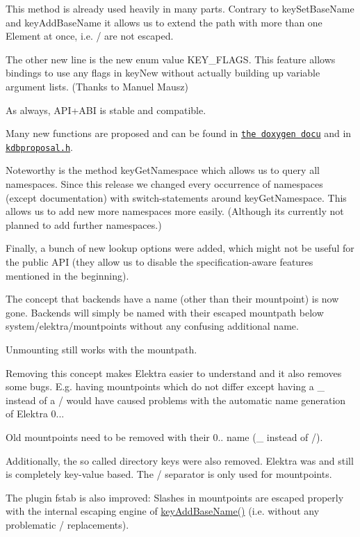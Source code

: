 This method is already used heavily in many parts. Contrary to {\ttfamily key\+Set\+Base\+Name} and {\ttfamily key\+Add\+Base\+Name} it allows us to extend the path with more than one Element at once, i.\+e. {\ttfamily /} are not escaped.

The other new line is the new enum value {\ttfamily K\+E\+Y\+\_\+\+F\+L\+A\+GS}. This feature allows bindings to use any flags in key\+New without actually building up variable argument lists. (Thanks to Manuel Mausz)

As always, A\+P\+I+\+A\+BI is stable and compatible.

Many new functions are proposed and can be found in \href{https://doc.libelektra.org/api/0.8.11/html}{\tt the doxygen docu} and in \href{https://github.com/ElektraInitiative/libelektra/blob/master/src/include/kdbproposal.h}{\tt kdbproposal.\+h}.

Noteworthy is the method {\ttfamily key\+Get\+Namespace} which allows us to query all namespaces. Since this release we changed every occurrence of namespaces (except documentation) with switch-\/statements around {\ttfamily key\+Get\+Namespace}. This allows us to add new more namespaces more easily. (Although its currently not planned to add further namespaces.)

Finally, a bunch of new lookup options were added, which might not be useful for the public A\+PI (they allow us to disable the specification-\/aware features mentioned in the beginning).

The concept that backends have a name (other than their mountpoint) is now gone. Backends will simply be named with their escaped mountpath below system/elektra/mountpoints without any confusing additional name.

Unmounting still works with the mountpath.

Removing this concept makes Elektra easier to understand and it also removes some bugs. E.\+g. having mountpoints which do not differ except having a {\ttfamily \+\_\+} instead of a {\ttfamily /} would have caused problems with the automatic name generation of Elektra 0...

Old mountpoints need to be removed with their 0.. name ({\ttfamily \+\_\+} instead of {\ttfamily /}).

Additionally, the so called directory keys were also removed. Elektra was and still is completely key-\/value based. The {\ttfamily /} separator is only used for mountpoints.

The plugin fstab is also improved\+: Slashes in mountpoints are escaped properly with the internal escaping engine of \hyperlink{group__keyname_gaa942091fc4bd5c2699e49ddc50829524}{key\+Add\+Base\+Name()} (i.\+e. without any problematic {\ttfamily /} replacements).

